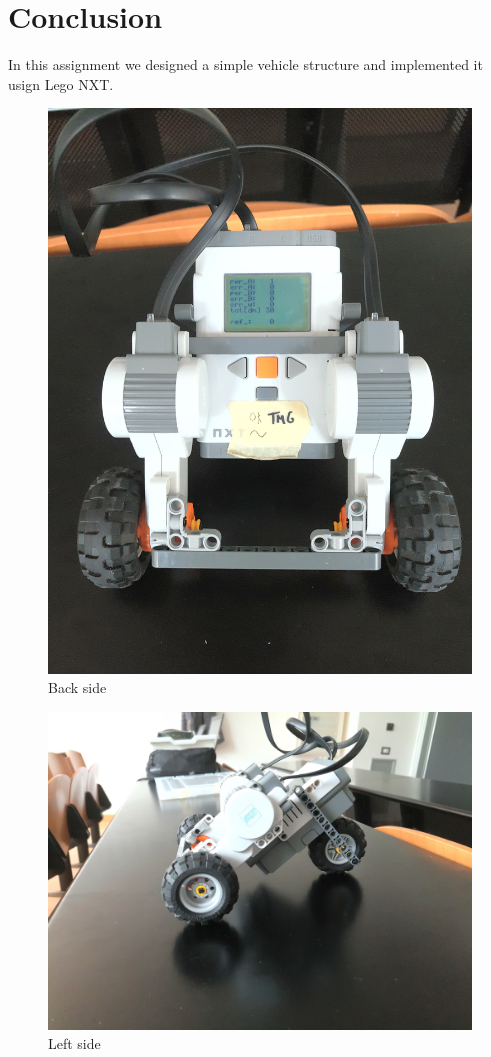 \documentclass[a4paper,12pt,oneside]{article}
\begin{document}
\section{Conclusion}

In this assignment we designed a simple vehicle structure and implemented it usign Lego NXT.


\begin{figure}
	\centering
	\includegraphics[width=\columnwidth]{nxtImages/1.jpg}
	\caption{Back side}
	\label{fig:back}
\end{figure}
\begin{figure}
	\centering
	\includegraphics[width=\columnwidth]{nxtImages/2.jpg}
	\caption{Left side}
	\label{fig:left}
\end{figure}
\end{document}
